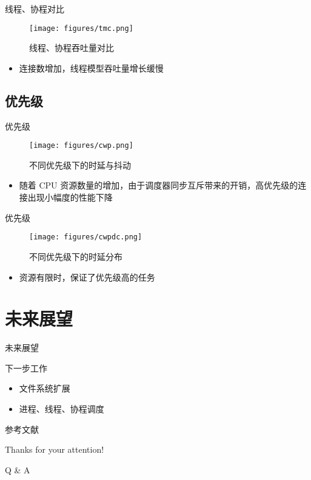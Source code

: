 \documentclass{beamer}
\begin{document}
\begin{frame}{线程、协程对比}
  \begin{figure}[htbp]
    \centering
    \texttt{[image: figures/tmc.png]}
    \caption{线程、协程吞吐量对比}
    \label{fig:tmc}
  \end{figure} 
  \begin{itemize}
    \setlength{\itemsep}{6pt}
    \item 连接数增加，线程模型吞吐量增长缓慢
  \end{itemize} 
\end{frame}

\subsection{优先级}

\begin{frame}{优先级}
  \begin{figure}[htbp]
    \centering
    \texttt{[image: figures/cwp.png]}
    \caption{不同优先级下的时延与抖动}
    \label{fig:cwp}
  \end{figure}
  \begin{itemize}
    \setlength{\itemsep}{6pt}
    \item 随着 CPU 资源数量的增加，由于调度器同步互斥带来的开销，高优先级的连接出现小幅度的性能下降
  \end{itemize}
\end{frame}

\begin{frame}{优先级}
  \begin{figure}[htbp]
    \centering
    \texttt{[image: figures/cwpdc.png]}
    \caption{不同优先级下的时延分布}
    \label{fig:cwpdc}
  \end{figure}  
  \begin{itemize}
    \setlength{\itemsep}{6pt}
    \item 资源有限时，保证了优先级高的任务
  \end{itemize}
\end{frame}

\section{未来展望}

\begin{frame}{未来展望}
  \begin{block}{下一步工作}
    \begin{itemize}
      \item 文件系统扩展
      \item 进程、线程、协程调度
    \end{itemize}
  \end{block}
\end{frame}


\begin{frame}[allowframebreaks]{参考文献}
  
  
\end{frame}

\begin{frame}
	\begin{center}
    {\Huge\calligra Thanks for your attention!}
    \vspace{1cm}

    {\Huge Q \& A}
  \end{center}
\end{frame}

\end{document}
